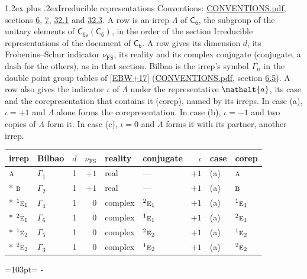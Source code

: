 \documentclass[10pt,a4paper]{article}
\makeatletter
\renewcommand\section{\@startsection{section}{1}{\z@}{-3ex plus -1ex minus -.2ex}%
  {1.2ex plus .2ex}{\normalfont\large\sffamily\bfseries\color{parttitle}}}
\newcommand{\needspace}[1]{\par\penalty-100\begingroup\dimen0=#1\relax\dimen2=\pagegoal
  \advance\dimen2-\pagetotal\ifdim\dimen0>\dimen2\relax\ifdim\dimen2>0pt\vfil\break\fi\fi
  \endgroup}
\numberwithin{equation}{section}
\newcommand{\eltfont}[1]{{\let\sigma\eltsigma\mathelt{#1}}}
\newcommand{\grp}[1]{\mathsf{#1}}
\newcommand{\irr}[1]{\text{\normalfont\scshape #1}}
\newcommand{\conjpair}[1]{{}^{#1}}
\newcommand{\elt}[1]{\eltfont{#1}}
\newcommand{\fsind}{\nu_{\mathrm{FS}}}
\makeatother
\begin{document}
\section{Irreducible representations}\label{s:irreps}
Conventions: \href{../../CONVENTIONS.pdf}{CONVENTIONS.pdf}, sections \href{../../../rotation/CONVENTIONS.pdf\#conv.6}{6}, \href{../../../rotation/CONVENTIONS.pdf\#conv.7}{7}, \href{../../CONVENTIONS.pdf\#conv.32.1}{32.1} and \href{../../CONVENTIONS.pdf\#conv.32.3}{32.3}.
\leavevmode\label{n:irrep.Delta}A row is an irrep $\Lambda$ of $\grp{C_{6}}$, the subgroup of the unitary elements of $\grp{C_{6v}}(\grp{C_{6}})$, in the order of the section Irreducible representations of the document of \href{../../../rotation/data/pdf/C6.pdf}{$\grp{C_{6}}$}. \label{n:index.dimension}\label{n:index.frobenius}\label{n:head.irrep}\label{n:head.reality}\label{n:head.conjugate}A row gives its dimension $d$, its Frobenius--Schur indicator $\fsind$, its reality and its complex conjugate (conjugate, a dash for the others), as in that section. \label{n:head.bilbao}\label{n:irrep.alias.gamma}Bilbao is the irrep's symbol $\Gamma_n$ in the double point group tables of [\href{../../../REFERENCES.pdf\#ref.EBW+17}{EBW+17}] (\href{../../CONVENTIONS.pdf}{CONVENTIONS.pdf}, section \href{../../../rotation/CONVENTIONS.pdf\#conv.6.5}{6.5}). \label{n:head.case.corep}\label{n:head.corep}A row also gives the indicator $\iota$ of $\Lambda$ under the representative $\elt{a}$, its case and the corepresentation that contains it (corep), named by its irreps. In case (a), $\iota = +1$ and $\Lambda$ alone forms the corepresentation. In case (b), $\iota = -1$ and two copies of $\Lambda$ form it. In case (c), $\iota = 0$ and $\Lambda$ forms it with its partner, another irrep.
\setlength{\emergencystretch}{2em}\par\setlength{\emergencystretch}{0pt}
{\small\renewcommand{\arraystretch}{1.25}\setlength{\tabcolsep}{4pt}\begin{longtable}{@{}llrrllrll@{}}\toprule
irrep & Bilbao & $d$ & $\fsind$ & reality & conjugate & $\iota$ & case & corep\\\midrule\endhead
\bottomrule\endfoot\endlastfoot
$\irr{a}$ & $\Gamma_{1}$ & 1 & $+1$ & real & --- & $+1$ & (a) & $\irr{a}$\\*
$\irr{b}$ & $\Gamma_{2}$ & 1 & $+1$ & real & --- & $+1$ & (a) & $\irr{b}$\\*
$\conjpair{1}\irr{e}_{1}$ & $\Gamma_{4}$ & 1 & $0$ & complex & $\conjpair{2}\irr{e}_{1}$ & $+1$ & (a) & $\conjpair{1}\irr{e}_{1}$\\*
$\conjpair{2}\irr{e}_{1}$ & $\Gamma_{6}$ & 1 & $0$ & complex & $\conjpair{1}\irr{e}_{1}$ & $+1$ & (a) & $\conjpair{2}\irr{e}_{1}$\\*
$\conjpair{1}\irr{e}_{2}$ & $\Gamma_{5}$ & 1 & $0$ & complex & $\conjpair{2}\irr{e}_{2}$ & $+1$ & (a) & $\conjpair{1}\irr{e}_{2}$\\*
$\conjpair{2}\irr{e}_{2}$ & $\Gamma_{3}$ & 1 & $0$ & complex & $\conjpair{1}\irr{e}_{2}$ & $+1$ & (a) & $\conjpair{2}\irr{e}_{2}$\\
\bottomrule\end{longtable}}
\needspace{103pt}
\end{document}
